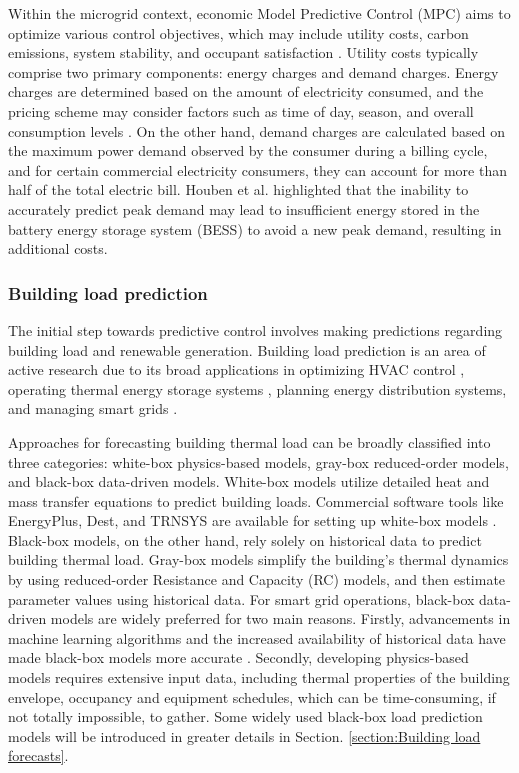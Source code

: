 Within the microgrid context, economic Model Predictive Control (MPC) aims to optimize various control objectives, which may include utility costs, carbon emissions, system stability, and occupant satisfaction \cite{MEMS_LR}. Utility costs typically comprise two primary components: energy charges and demand charges. Energy charges are determined based on the amount of electricity consumed, and the pricing scheme may consider factors such as time of day, season, and overall consumption levels \cite{fernandez2023demand}. On the other hand, demand charges are calculated based on the maximum power demand observed by the consumer during a billing cycle, and for certain commercial electricity consumers, they can account for more than half of the total electric bill. Houben et al. \cite{uncertainty_dc} highlighted that the inability to accurately predict peak demand may lead to insufficient energy stored in the battery energy storage system (BESS) to avoid a new peak demand, resulting in additional costs.

\subsubsection{Building load prediction}

The initial step towards predictive control involves making predictions regarding building load and renewable generation. Building load prediction is an area of active research due to its broad applications in optimizing HVAC control \cite{kusiak2010cooling}, operating thermal energy storage systems \cite{luo2017data}, planning energy distribution systems\cite{pedersen2008load}, and managing smart grids \cite{xue2014interactive}. 

Approaches for forecasting building thermal load can be broadly classified into three categories: white-box physics-based models, gray-box reduced-order models, and black-box data-driven models\cite{wang2020building}. White-box models utilize detailed heat and mass transfer equations to predict building loads. Commercial software tools like EnergyPlus, Dest, and TRNSYS are available for setting up white-box models \cite{li2014review}. Black-box models, on the other hand, rely solely on historical data to predict building thermal load. Gray-box models simplify the building's thermal dynamics by using reduced-order Resistance and Capacity (RC) models, and then estimate parameter values using historical data. For smart grid operations, black-box data-driven models are widely preferred for two main reasons. Firstly, advancements in machine learning algorithms and the increased availability of historical data have made black-box models more accurate \cite{liu2023timetabling}. Secondly, developing physics-based models requires extensive input data, including thermal properties of the building envelope, occupancy and equipment schedules, which can be time-consuming, if not totally impossible, to gather. Some widely used black-box load prediction models will be introduced in greater details in Section. \ref{section:Building load forecasts}.

